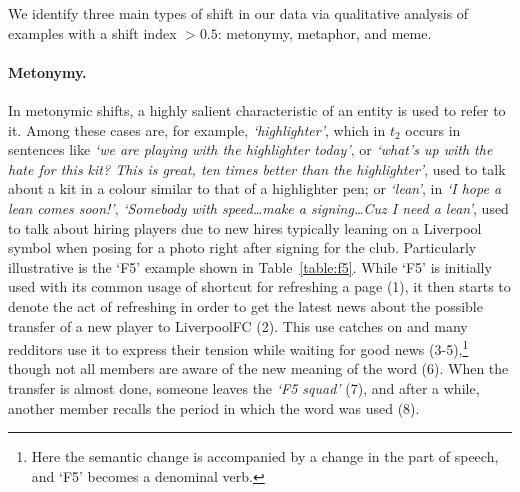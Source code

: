 We identify three main types of shift in our data via qualitative analysis of examples with a shift index $> 0.5$: metonymy, metaphor, and meme.  

\paragraph{Metonymy.}
In metonymic shifts, a highly salient characteristic of an entity is used to refer to it. Among these cases are, for example, {\em `highlighter'}, which in $t_2$ occurs in sentences like \textit{`we are playing with the highlighter today'}, or \textit{`what's up with the hate for this kit? This is great, ten times better than the highlighter'},
used to talk about a kit in a colour similar to that of a highlighter pen; or {\em `lean'}, in \textit{`I hope a lean comes soon!'}, \textit{`Somebody with speed\dots make a signing\dots Cuz I need a lean'},
used to talk about hiring players due to new hires typically leaning on a Liverpool symbol when posing for a photo right after signing for the club. Particularly illustrative is the `F5' example shown in
Table~\ref{table:f5}. While `F5' is initially used with its common usage of shortcut for refreshing a page (1), it then starts to denote the act of refreshing in order to get the latest news about the possible transfer of a new player to LiverpoolFC (2). This use catches on and many redditors use it to express their tension while waiting for good news (3-5),\footnote{Here the semantic change is accompanied by a change in the part of speech, and `F5' becomes a denominal verb.}
though not all members are aware of the new meaning of the word (6). When the transfer is almost done, someone leaves the {\em `F5 squad'} (7), and after a while, another member recalls the period in which the word was used (8).

